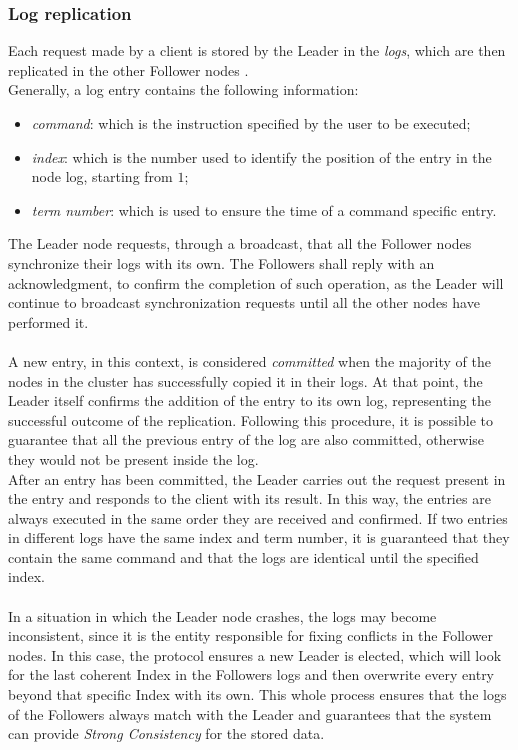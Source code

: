 \subsubsection{Log replication}\label{etcd-replication}
Each request made by a client is stored by the Leader in the \textit{logs}, which are then replicated in the other Follower nodes \cite{site:raft-consensus-algorithm}. \\
Generally, a log entry contains the following information:
\begin{itemize}
	\item \textit{command}: which is the instruction specified by the user to be executed;
	\item \textit{index}: which is the number used to identify the position of the entry in the node log, starting from $1$;
	\item \textit{term number}: which is used to ensure the time of a command specific entry.
\end{itemize}
The Leader node requests, through a broadcast, that all the Follower nodes synchronize their logs with its own. The Followers shall reply with an acknowledgment, to confirm the completion of such operation, as the Leader will continue to broadcast synchronization requests until all the other nodes have performed it. \\ \\
A new entry, in this context, is considered \textit{committed} when the majority of the nodes in the cluster has successfully copied it in their logs. At that point, the Leader itself confirms the addition of the entry to its own log, representing the successful outcome of the replication. Following this procedure, it is possible to guarantee that all the previous entry of the log are also committed, otherwise they would not be present inside the log. \\
After an entry has been committed, the Leader carries out the request present in the entry and responds to the client with its result. In this way, the entries are always executed in the same order they are received and confirmed. If two entries in different logs have the same index and term number, it is guaranteed that they contain the same command and that the logs are identical until the specified index. \\ \\
In a situation in which the Leader node crashes, the logs may become inconsistent, since it is the entity responsible for fixing conflicts in the Follower nodes. In this case, the protocol ensures a new Leader is elected, which will look for the last coherent Index in the Followers logs and then overwrite every entry beyond that specific Index with its own. This whole process ensures that the logs of the Followers always match with the Leader and guarantees that the system can provide \textit{Strong Consistency} for the stored data.

